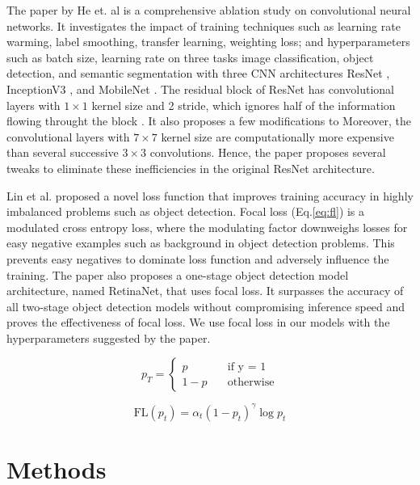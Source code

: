 \documentclass[conference]{IEEEtran}
\begin{document}
The paper by He et. al is a comprehensive ablation study on convolutional neural networks.
It investigates the impact of training techniques such as 
learning rate warming, label smoothing, transfer learning, weighting loss; 
and hyperparameters such as batch size, learning rate on three tasks image classification, 
object detection, and semantic segmentation with three CNN architectures
ResNet \cite{ResNet2016}, Inception\-V3 \cite{InceptionNetV3}, 
and MobileNet \cite{MobileNet2017}. The residual block of ResNet has convolutional layers 
with $1 \times 1$ kernel size and 2 stride, which ignores half of the information flowing throught the block \cite{BagOfTricks}. It also proposes a few modifications to 
Moreover, the convolutional layers with $7 \times 7$ kernel size are computationally 
more expensive than several successive $3 \times 3$ convolutions. Hence, the paper
proposes several tweaks to eliminate these inefficiencies in the original ResNet architecture.

Lin et al. \cite{FocalLoss} proposed a novel loss function that improves training accuracy in 
highly imbalanced problems such as object detection. Focal loss (Eq.\ref{eq:fl}) is a modulated 
cross entropy loss, where the modulating factor downweighs losses for easy 
negative examples such as background in object detection problems. This prevents 
easy negatives to dominate loss function and adversely influence the training.
The paper also proposes a one-stage object detection model architecture, named RetinaNet, 
that uses focal loss. It surpasses the accuracy of all two-stage object detection models 
without compromising inference speed and proves the effectiveness of focal loss.
We use focal loss in our models with the hyperparameters suggested by the paper.

\begin{equation*}
    p_T = 
    \begin{cases}
        p &\quad \text{if y = 1} \\
        1 - p &\quad \text{otherwise}
    \end{cases}
\end{equation*}

\begin{equation}
    \text{FL}(p_t) = \alpha_t (1 - p_t)^{\gamma}\log{p_t} \label{eq:fl}
\end{equation}

\section{Methods}
\end{document}
